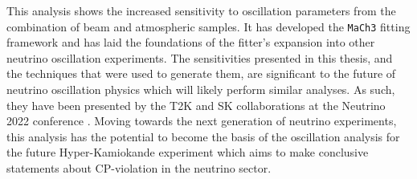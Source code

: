 This analysis shows the increased sensitivity to oscillation parameters from the combination of beam and atmospheric samples. It has developed the \texttt{MaCh3} fitting framework and has laid the foundations of the fitter's expansion into other neutrino oscillation experiments. The sensitivities presented in this thesis, and the techniques that were used to generate them, are significant to the future of neutrino oscillation physics which will likely perform similar analyses. As such, they have been presented by the T2K and SK collaborations at the Neutrino 2022 conference \cite{Bronner2022-wd}. Moving towards the next generation of neutrino experiments, this analysis has the potential to become the basis of the oscillation analysis for the future Hyper-Kamiokande experiment which aims to make conclusive statements about CP-violation in the neutrino sector.



